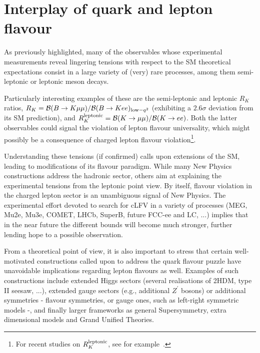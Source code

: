 \section{Interplay of quark and lepton flavour}

As previously highlighted, many of the observables whose experimental
measurements reveal lingering tensions with respect to the SM
theoretical expectations consist in a large variety of 
(very) rare processes, among them semi-leptonic
or leptonic meson decays.

Particularly interesting examples of
these are the semi-leptonic and leptonic $R_K$ ratios, 
$R_K = {\cal B}(B\rightarrow K\mu\mu)/{\cal B}(B\rightarrow Kee)_{{\rm low}-q^2}$ (exhibiting a 
$2.6\sigma$ deviation from its SM prediction), and 
$R_K^{\rm leptonic} = {\cal B}(K\rightarrow \mu\mu)/{\cal B}(K\rightarrow ee)$.
Both the latter observables could signal the violation of lepton flavour
universality, which might possibly be a consequence of charged lepton
flavour violation\footnote{For recent studies on $R_K^{\rm leptonic}$, see for
  example~\cite{Fonseca:2012kr,Abada:2012mc,Abada:2013aba}.}.   
 
Understanding these tensions (if confirmed) calls upon extensions of the SM, 
leading to modifications of its flavour paradigm. While many New Physics
constructions address the hadronic sector, others aim at explaining 
the experimental tensions
from the leptonic point view. 
By itself, flavour violation in the charged lepton sector is an 
unambiguous signal of New Physics. The experimental effort
devoted to search for cLFV in a variety of processes 
(MEG, Mu2e, Mu3e, COMET, LHCb, SuperB, future FCC-ee and LC, ...)
implies that in the near future the 
different bounds will become much stronger, further lending hope to a
possible observation. 

From a theoretical point of view, it is also important to stress that
certain well-motivated constructions called upon to address the quark flavour
puzzle have unavoidable implications regarding lepton flavours as
well. 
Examples of such constructions include extended Higgs sectors
(several realisations of 2HDM, type II seesaw, ...),
extended gauge sectors 
(e.g., additional $Z^\prime$ bosons) or additional symmetries - flavour
symmetries, or gauge ones, such as left-right symmetric models -, and finally 
larger frameworks as general Supersymmetry, extra dimensional models and
Grand Unified Theories. 

